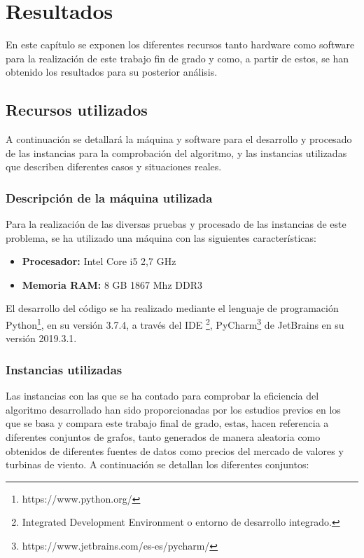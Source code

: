 
\chapter{Resultados} %

\label{Chapter5} %


En este capítulo se exponen los diferentes recursos tanto hardware como software para la realización de este trabajo fin de grado y como, a partir de estos, se han obtenido los resultados para su posterior análisis.

\section{Recursos utilizados}
A continuación se detallará la máquina  y software para el desarrollo y procesado de las instancias para la comprobación del algoritmo, y las instancias utilizadas que describen diferentes casos y situaciones reales.

\subsection{Descripción de la máquina utilizada}
Para la realización de las diversas pruebas y procesado de las instancias de este problema, se ha utilizado una máquina con las siguientes características:

\begin{itemize}

\item \textbf{Procesador:} Intel Core i5 2,7 GHz
\item \textbf{Memoria RAM:} 8 GB 1867 Mhz DDR3
\end{itemize}

El desarrollo del código se ha realizado mediante el lenguaje de programación Python\footnote{https://www.python.org/}, en su versión 3.7.4, a través del IDE \footnote{Integrated Development Environment o entorno de desarrollo integrado.}, PyCharm\footnote{https://www.jetbrains.com/es-es/pycharm/} de JetBrains en su versión 2019.3.1.

\subsection{Instancias utilizadas}
Las instancias con las que se ha contado para comprobar la eficiencia del algoritmo desarrollado han sido proporcionadas por los estudios previos en los que se basa y compara este trabajo final de grado, estas, hacen referencia a diferentes conjuntos de grafos, tanto generados de manera aleatoria como obtenidos de diferentes fuentes de datos como precios del mercado de valores y turbinas de viento. A continuación se detallan los diferentes conjuntos:

